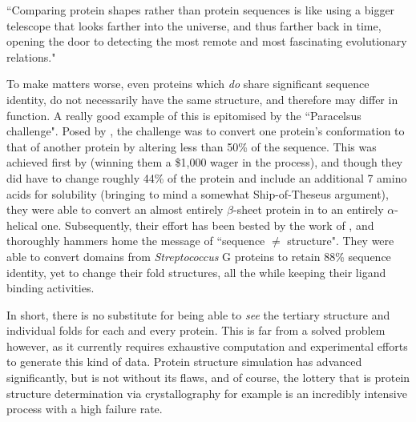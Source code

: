 \begin{displayquote}
``Comparing protein shapes rather than protein sequences is like using a bigger telescope that looks farther into the universe, and thus farther back in time, opening the door to detecting the most remote and most fascinating evolutionary relations."
\end{displayquote}

To make matters worse, even proteins which \emph{do} share significant sequence identity, do not necessarily have the same structure, and therefore may differ in function. A really good example of this is epitomised by the ``Paracelsus challenge". Posed by \cite{Rose1994}, the challenge was to convert one protein's conformation to that of another protein by altering less than 50\% of the sequence. This was achieved first by \cite{Dalal1997} (winning them a \$1,000 wager in the process), and though they did have to change roughly 44\% of the protein and include an additional 7 amino acids for solubility (bringing to mind a somewhat Ship-of-Theseus argument), they were able to convert an almost entirely $\beta$-sheet protein in to an entirely $\alpha$-helical one. Subsequently, their effort has been bested by the work of \cite{Alexander2007}, and thoroughly hammers home the message of ``sequence $\neq$ structure". They were able to convert domains from \emph{Streptococcus} G proteins to retain 88\% sequence identity, yet to change their fold structures, all the while keeping their ligand binding activities.

In short, there is no substitute for being able to \emph{see} the tertiary structure and individual folds for each and every protein. This is far from a solved problem however, as it currently requires exhaustive computation and experimental efforts to generate this kind of data. Protein structure simulation has advanced significantly, but is not without its flaws, and of course, the lottery that is protein structure determination via crystallography for example is an incredibly intensive process with a high failure rate. 


